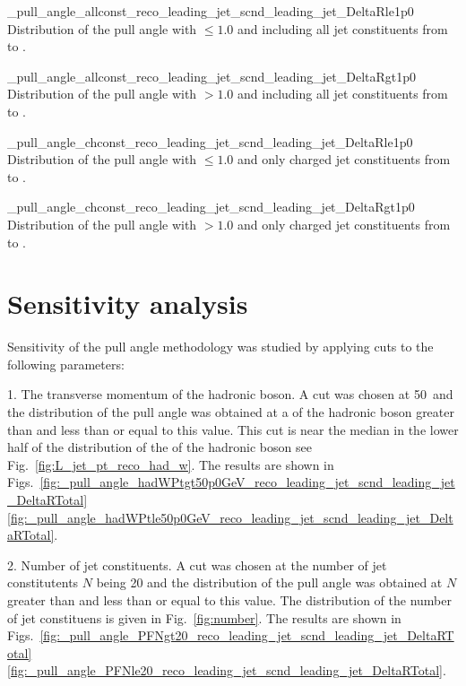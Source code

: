           {_pull_angle_allconst_reco_leading_jet_scnd_leading_jet_DeltaRle1p0}
          {Distribution of the pull angle with \DeltaR$\leq1.0$ and including all jet constituents from \leadingjet to \scndleadingjet.}

          {_pull_angle_allconst_reco_leading_jet_scnd_leading_jet_DeltaRgt1p0}
          {Distribution of the pull angle with \DeltaR$>1.0$ and including all jet constituents from \leadingjet to \scndleadingjet.}

          {_pull_angle_chconst_reco_leading_jet_scnd_leading_jet_DeltaRle1p0}
          {Distribution of the pull angle with \DeltaR$\leq1.0$ and only charged jet constituents from \leadingjet to \scndleadingjet.}

          {_pull_angle_chconst_reco_leading_jet_scnd_leading_jet_DeltaRgt1p0}
          {Distribution of the pull angle with \DeltaR$>1.0$ and only charged jet constituents from \leadingjet to \scndleadingjet.}


\section{Sensitivity analysis}

Sensitivity of the pull angle methodology was studied by applying cuts to the following parameters:

1. The transverse momentum \pt of the hadronic \PW boson. A cut was chosen at 50~\GeV and the distribution of the pull angle was obtained at a \pt of the hadronic \PW boson greater than and less than or equal to this value. This cut is near the median in the lower half of the distribution of the \pt of the hadronic \PW boson \textendash see Fig.~\ref{fig:L_jet_pt_reco_had_w}. The results are shown in Figs.~\ref{fig:_pull_angle_hadWPtgt50p0GeV_reco_leading_jet_scnd_leading_jet_DeltaRTotal}\textendash\ref{fig:_pull_angle_hadWPtle50p0GeV_reco_leading_jet_scnd_leading_jet_DeltaRTotal}.

2. Number of jet constituents. A cut was chosen at the number of jet constitutents $N$ being 20 and the distribution of the pull angle was obtained at $N$ greater than and less than or equal to this value. The distribution of the number of jet constituens is given in Fig.~\ref{fig:number}. The results are shown in Figs.~\ref{fig:_pull_angle_PFNgt20_reco_leading_jet_scnd_leading_jet_DeltaRTotal}\textendash\ref{fig:_pull_angle_PFNle20_reco_leading_jet_scnd_leading_jet_DeltaRTotal}.
                                        
